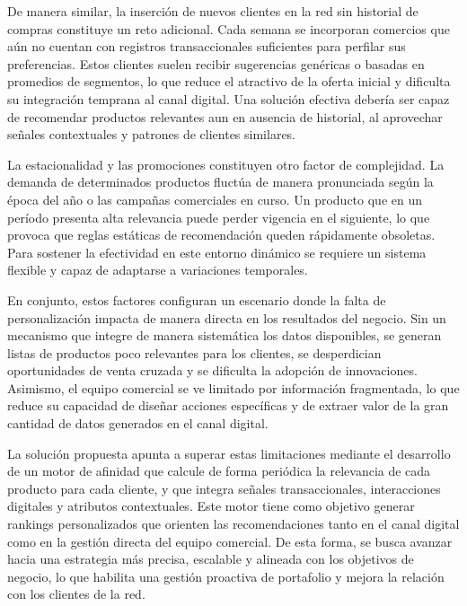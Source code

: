 De manera similar, la inserción de nuevos clientes en la red sin historial de compras constituye un reto adicional. Cada semana se incorporan comercios que aún no cuentan con registros transaccionales suficientes para perfilar sus preferencias. Estos clientes suelen recibir sugerencias genéricas o basadas en promedios de segmentos, lo que reduce el atractivo de la oferta inicial y dificulta su integración temprana al canal digital. Una solución efectiva debería ser capaz de recomendar productos relevantes aun en ausencia de historial, al aprovechar señales contextuales y patrones de clientes similares.

La estacionalidad y las promociones constituyen otro factor de complejidad. La demanda de determinados productos fluctúa de manera pronunciada según la época del año o las campañas comerciales en curso. Un producto que en un período presenta alta relevancia puede perder vigencia en el siguiente, lo que provoca que reglas estáticas de recomendación queden rápidamente obsoletas. Para sostener la efectividad en este entorno dinámico se requiere un sistema flexible y capaz de adaptarse a variaciones temporales.

En conjunto, estos factores configuran un escenario donde la falta de personalización impacta de manera directa en los resultados del negocio. Sin un mecanismo que integre de manera sistemática los datos disponibles, se generan listas de productos poco relevantes para los clientes, se desperdician oportunidades de venta cruzada y se dificulta la adopción de innovaciones. Asimismo, el equipo comercial se ve limitado por información fragmentada, lo que reduce su capacidad de diseñar acciones específicas y de extraer valor de la gran cantidad de datos generados en el canal digital.

La solución propuesta apunta a superar estas limitaciones mediante el desarrollo de un motor de afinidad que calcule de forma periódica la relevancia de cada producto para cada cliente, y que integra señales transaccionales, interacciones digitales y atributos contextuales. Este motor tiene como objetivo generar rankings personalizados que orienten las recomendaciones tanto en el canal digital como en la gestión directa del equipo comercial. De esta forma, se busca avanzar hacia una estrategia más precisa, escalable y alineada con los objetivos de negocio, lo que habilita una gestión proactiva de portafolio y mejora la relación con los clientes de la red.


